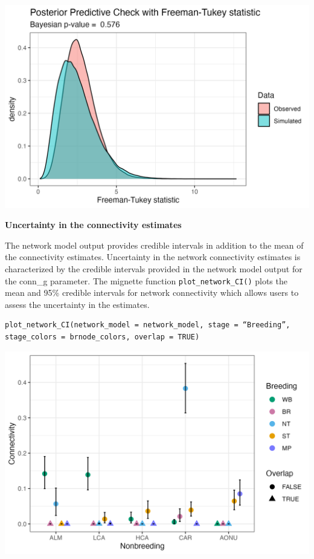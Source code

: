 \documentclass[
]{book}
\begin{document}
\includegraphics[width=25in]{./images/p.fit}

\textbf{Uncertainty in the connectivity estimates}

The network model output provides credible intervals in addition to the mean of the connectivity estimates. Uncertainty in the network connectivity estimates is characterized by the credible intervals provided in the network model output for the conn\_g parameter. The mignette function \texttt{plot\_network\_CI()} plots the mean and 95\% credible intervals for network connectivity which allows users to assess the uncertainty in the estimates.

\begin{verbatim}
plot_network_CI(network_model = network_model, stage = “Breeding”, 
stage_colors = brnode_colors, overlap = TRUE)
\end{verbatim}

\includegraphics[width=25in]{./images/p.ci}
\end{document}
